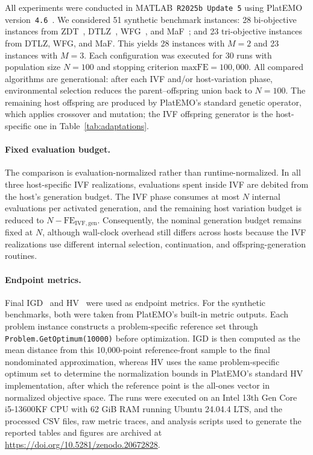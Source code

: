 \documentclass[runningheads]{llncs}
\begin{document}
All experiments were conducted in MATLAB~\texttt{R2025b Update 5} using PlatEMO version~\texttt{4.6}~\cite{tian2017platemo}. We considered 51 synthetic benchmark instances: 28 bi-objective instances from ZDT~\cite{zitzler2000zdt}, DTLZ~\cite{deb2005dtlz}, WFG~\cite{huband2006wfg}, and MaF~\cite{cheng2017maf}; and 23 tri-objective instances from DTLZ, WFG, and MaF. This yields 28 instances with $M=2$ and 23 instances with $M=3$. Each configuration was executed for 30 runs with population size $N=100$ and stopping criterion $\mathrm{maxFE}=100{,}000$. All compared algorithms are generational: after each IVF and/or host-variation phase, environmental selection reduces the parent--offspring union back to $N=100$. The remaining host offspring are produced by PlatEMO's standard genetic operator, which applies crossover and mutation; the IVF offspring generator is the host-specific one in Table~\ref{tab:adaptations}.

\paragraph{Fixed evaluation budget.}
The comparison is evaluation-normalized rather than runtime-normalized. In all three host-specific IVF realizations, evaluations spent inside IVF are debited from the host's generation budget. The IVF phase consumes at most $N$ internal evaluations per activated generation, and the remaining host variation budget is reduced to \(N - \mathrm{FE}_{\mathrm{IVF,gen}}\). Consequently, the nominal generation budget remains fixed at $N$, although wall-clock overhead still differs across hosts because the IVF realizations use different internal selection, continuation, and offspring-generation routines.

\paragraph{Endpoint metrics.}
Final IGD~\cite{zitzler1999igd} and HV~\cite{zitzler2003hv} were used as endpoint metrics. For the synthetic benchmarks, both were taken from PlatEMO's built-in metric outputs. Each problem instance constructs a problem-specific reference set through \texttt{Problem.GetOptimum(10000)} before optimization. IGD is then computed as the mean distance from this 10{,}000-point reference-front sample to the final nondominated approximation, whereas HV uses the same problem-specific optimum set to determine the normalization bounds in PlatEMO's standard HV implementation, after which the reference point is the all-ones vector in normalized objective space. The runs were executed on an Intel 13th Gen Core i5-13600KF CPU with 62 GiB RAM running Ubuntu 24.04.4 LTS, and the processed CSV files, raw metric traces, and analysis scripts used to generate the reported tables and figures are archived at \url{https://doi.org/10.5281/zenodo.20672828}.
\end{document}
